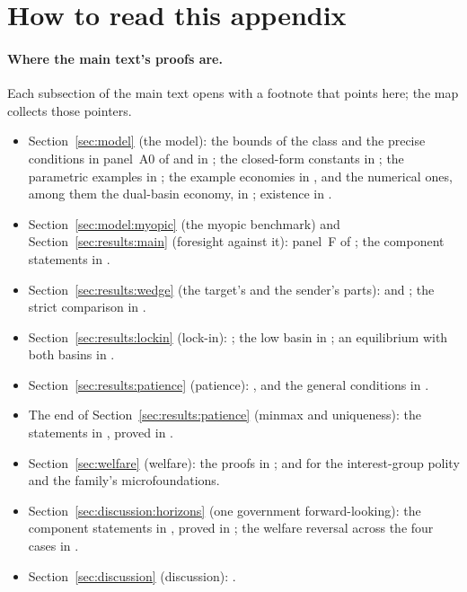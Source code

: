 \section*{How to read this appendix}

\paragraph{Where the main text's proofs are.} Each subsection of the main text
opens with a footnote that points here; the map collects those pointers.
\begin{itemize}
\item Section~\ref{sec:model} (the model): the bounds of the class and the precise conditions
in panel~A0 of  and in
; the closed-form constants in
; the parametric examples in ; the
example economies in , and the numerical ones, among them the dual-basin
economy, in ; existence in .
\item Section~\ref{sec:model:myopic} (the myopic benchmark) and Section~\ref{sec:results:main} (foresight against it):
panel~F of ; the component statements in
.
\item Section~\ref{sec:results:wedge} (the target's and the sender's parts):  and
; the strict comparison in
.
\item Section~\ref{sec:results:lockin} (lock-in): ; the low basin in
; an equilibrium with both basins in .
\item Section~\ref{sec:results:patience} (patience): , and
the general conditions in .
\item The end of Section~\ref{sec:results:patience} (minmax and uniqueness): the statements in
, proved in .
\item Section~\ref{sec:welfare} (welfare): the proofs in ;
 and  for the
interest-group polity and the family's microfoundations.
\item Section~\ref{sec:discussion:horizons} (one government forward-looking): the component statements in
, proved in ;
the welfare reversal across the four cases in .
\item Section~\ref{sec:discussion} (discussion): .
\end{itemize}


